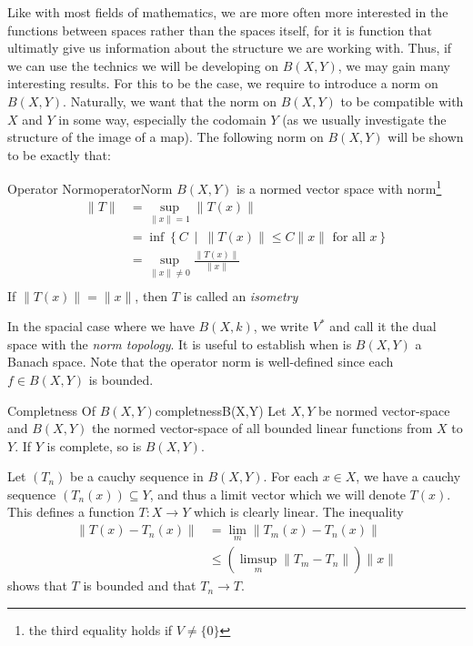 \documentclass[oneside]{book}
\newcommand{\sse}{\subseteq}
\newcommand{\rw}{\rightarrow}
\newcommand{\set}[2]{\left\{#1 \ \middle|\ #2\right\}}
\begin{document}
Like with most fields of mathematics, we are more often more interested in the functions between spaces rather than the
spaces itself, for it is function that ultimatly give us information about the structure we are working with. Thus, if
we can use the technics we will be developing on $B(X,Y)$, we may gain many interesting results. For this to be the
case,  we require to introduce a norm on $B(X,Y)$. Naturally, we want that the norm on $B(X,Y)$ to be compatible with
$X$ and $Y$ in some way, especially the codomain $Y$ (as we usually investigate the structure of the image of a map).
The following norm on $B(X,Y)$ will be shown to be exactly that:

\begin{defn}{Operator Norm}{operatorNorm}
	$B(X,Y)$ is a normed vector space with norm\footnote{the third equality holds if $V \ne \{0\}$}
	\begin{align*}
		\|T\| &= \sup_{\|x\| = 1}{\|T(x)\|}\\
		&= \inf\set{C}{\|T(x)\| \le C\|x\|\text{ for all $x$}}\\
		&= \sup_{\|x\| \ne 0}{\frac{\|T(x)\|}{\|x\|}}\\
	\end{align*}
	If $\|T(x)\| = \|x\|$, then $T$ is called an \emph{isometry}
\end{defn}
In the spacial case where we have $B(X, k)$, we write $V^*$ and call it the dual space with the \emph{norm topology}. It
is useful to establish when is $B(X,Y)$ a Banach space. Note that the operator norm is well-defined since each
$f \in B(X,Y)$ is bounded.

\begin{prop}{Completness Of $B(X, Y)$}{completnessB(X,Y)}
	Let $X, Y$ be normed vector-space and $B(X,Y)$ the normed vector-space of all bounded linear functions from $X$ to
	$Y$. If $Y$ is complete, so is $B(X, Y)$.
\end{prop}

\begin{Proof}
	Let $(T_n)$ be a cauchy sequence in $B(X, Y)$. For each $x \in X$, we have a cauchy sequence $(T_n(x)) \sse Y$,
	and thus a limit vector which we will denote $T(x)$. This defines a function $T: X \rw Y$ which is clearly
	linear. The inequality
	\begin{align*}
		\|T(x) - T_n(x)\| &= \lim_m \|T_m(x) - T_n(x)\|\\
						&\le (\limsup_m \|T_m - T_n\|)\|x\|
	\end{align*}
	shows that $T$ is bounded and that $T_n \rw T$.
\end{Proof}
\end{document}
